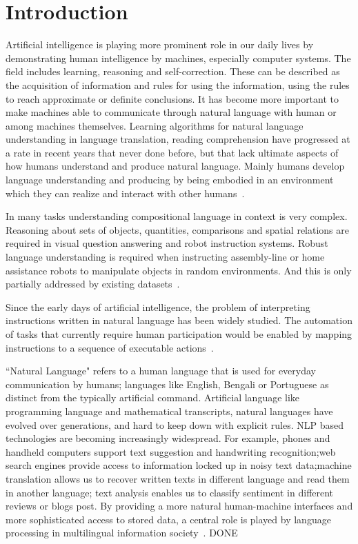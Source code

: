 \chapter{Introduction}
Artificial intelligence is playing more prominent role in our daily lives by demonstrating human intelligence by machines, especially computer systems. The field includes learning, reasoning and self-correction. These can be described as the acquisition of information and rules for using the information, using the rules to reach approximate or definite conclusions. It has become more important to make machines able to communicate through natural language with human or among machines themselves. Learning algorithms for natural language understanding in language translation, reading comprehension have progressed at a rate in recent years that never done before, but that lack ultimate aspects of how humans understand and produce natural language. Mainly humans develop language understanding and producing by being embodied in an environment which they can realize and interact with other humans~\cite{DBLP:journals/corr/abs-1807-03367}.

In many tasks understanding compositional language in context is very complex. Reasoning about sets of objects, quantities, comparisons and spatial relations are required in visual question answering and robot instruction systems. Robust language understanding is required when instructing assembly-line or home assistance robots to manipulate objects in random environments. And this is only partially addressed by existing datasets~\cite{Suhr2017ACO}.

Since the early days of artificial intelligence, the problem of interpreting instructions written in natural language has been widely studied. The automation of tasks that currently require human participation would be enabled by mapping instructions to a sequence of executable actions~\cite{RL}.



``Natural Language" refers to a human language that is used for everyday communication by humans; languages like English, Bengali or Portuguese as distinct from the typically artificial command. Artificial language like programming language and mathematical transcripts, natural languages have evolved over generations, and hard to keep down with explicit rules. NLP based technologies are becoming increasingly widespread. For example, phones and handheld computers support text suggestion and handwriting recognition;web search engines provide access to information locked up in noisy text data;machine translation allows us to recover written texts in different language and read them in another language; text analysis enables us to classify sentiment in different reviews or blogs post. By providing a more natural human-machine interfaces and more sophisticated access to stored data, a central role is played by language processing in multilingual information society~\cite{NLPbook}.
DONE

